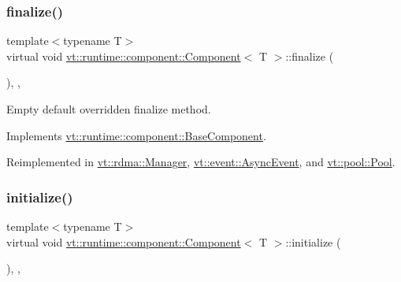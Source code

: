 \subsubsection{\texorpdfstring{finalize()}{finalize()}}
{\footnotesize\ttfamily template$<$typename T$>$ \\
virtual void \hyperlink{structvt_1_1runtime_1_1component_1_1_component}{vt\+::runtime\+::component\+::\+Component}$<$ T $>$\+::finalize (\begin{DoxyParamCaption}{ }\end{DoxyParamCaption})\hspace{0.3cm}{\ttfamily [inline]}, {\ttfamily [override]}, {\ttfamily [virtual]}}



Empty default overridden finalize method. 



Implements \hyperlink{structvt_1_1runtime_1_1component_1_1_base_component_ac03e2177ad2e26b1b8cb94c7e47e3eff}{vt\+::runtime\+::component\+::\+Base\+Component}.



Reimplemented in \hyperlink{structvt_1_1rdma_1_1_manager_ad4ff20cf1ba6e870326b20900e6eb581}{vt\+::rdma\+::\+Manager}, \hyperlink{structvt_1_1event_1_1_async_event_a77e3aafaae98603825556cdf8105ba57}{vt\+::event\+::\+Async\+Event}, and \hyperlink{structvt_1_1pool_1_1_pool_a45a2880809625a77bb93c3dfcd9c7603}{vt\+::pool\+::\+Pool}.

\mbox{\label{structvt_1_1runtime_1_1component_1_1_component_a7f07384d294e59796add9ce6be2d6410}} 
\subsubsection{\texorpdfstring{initialize()}{initialize()}}
{\footnotesize\ttfamily template$<$typename T$>$ \\
virtual void \hyperlink{structvt_1_1runtime_1_1component_1_1_component}{vt\+::runtime\+::component\+::\+Component}$<$ T $>$\+::initialize (\begin{DoxyParamCaption}{ }\end{DoxyParamCaption})\hspace{0.3cm}{\ttfamily [inline]}, {\ttfamily [override]}, {\ttfamily [virtual]}}



